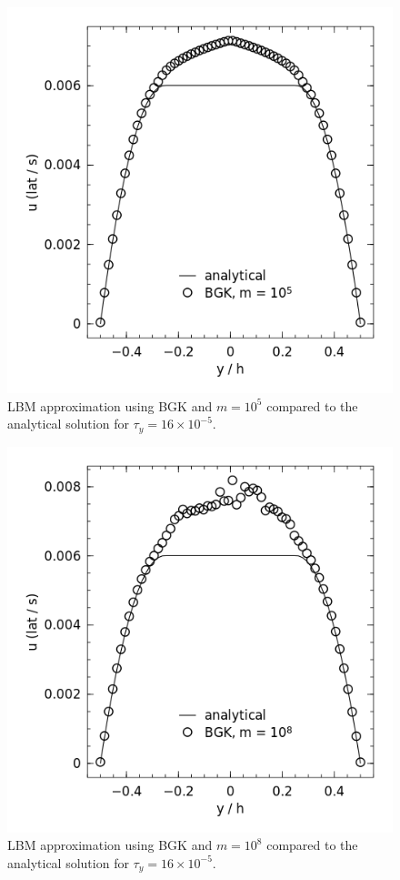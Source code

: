 \begin{figure}
\centering
\includegraphics[width=\linewidth]{figs/poise-bingham/bgk-5/analytical-vs-approx.png}
\caption{LBM approximation using BGK and $m = 10^5$ compared to the analytical solution for $\tau_y = 16 \times 10^{-5}$.}
\label{fig:bing-analyt-bgk-5}
\end{figure}

\begin{figure}
	\centering
    \includegraphics[width=\linewidth]{figs/poise-bingham/bgk-8/analytical-vs-approx.png}
    \caption{LBM approximation using BGK and $m = 10^8$ compared to the analytical solution for $\tau_y = 16 \times 10^{-5}$.}
\label{fig:bing-analyt-bgk-8}
\end{figure}

